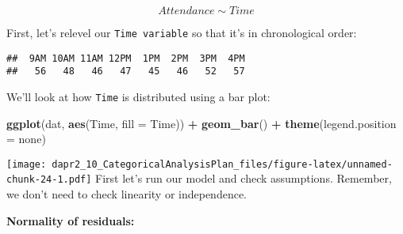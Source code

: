 \documentclass[
]{article}
\newenvironment{Shaded}{\begin{snugshade}}{\end{snugshade}}
\newcommand{\AttributeTok}[1]{\textcolor[rgb]{0.13,0.29,0.53}{#1}}
\newcommand{\FunctionTok}[1]{\textcolor[rgb]{0.13,0.29,0.53}{\textbf{#1}}}
\newcommand{\NormalTok}[1]{#1}
\newcommand{\OtherTok}[1]{\textcolor[rgb]{0.56,0.35,0.01}{#1}}
\newcommand{\SpecialCharTok}[1]{\textcolor[rgb]{0.81,0.36,0.00}{\textbf{#1}}}
\newcommand{\StringTok}[1]{\textcolor[rgb]{0.31,0.60,0.02}{#1}}
\begin{document}
\[Attendance \sim Time\]

First, let's relevel our \texttt{Time\ variable} so that it's in chronological order:

\begin{Shaded}
\end{Shaded}

\begin{verbatim}
##  9AM 10AM 11AM 12PM  1PM  2PM  3PM  4PM 
##   56   48   46   47   45   46   52   57
\end{verbatim}

We'll look at how \texttt{Time} is distributed using a bar plot:

\begin{Shaded}
\begin{Highlighting}[]
\FunctionTok{ggplot}\NormalTok{(dat, }\FunctionTok{aes}\NormalTok{(Time, }\AttributeTok{fill =}\NormalTok{ Time)) }\SpecialCharTok{+} \FunctionTok{geom\_bar}\NormalTok{() }\SpecialCharTok{+} 
  \FunctionTok{theme}\NormalTok{(}\AttributeTok{legend.position =} \StringTok{\textquotesingle{}none\textquotesingle{}}\NormalTok{)}
\end{Highlighting}
\end{Shaded}

\texttt{[image: dapr2\_10\_CategoricalAnalysisPlan\_files/figure-latex/unnamed-chunk-24-1.pdf]}
First let's run our model and check assumptions. Remember, we don't need to check linearity or independence.

\textbf{Normality of residuals:}
\end{document}
